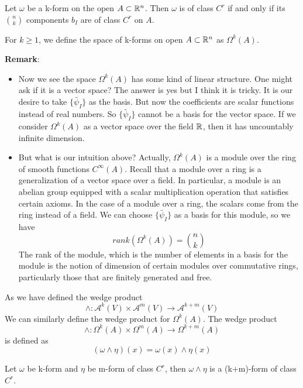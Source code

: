 \begin{corollary}
    Let $\omega$ be a k-form on the open $A\subset\mathbb{R}^n$. Then $\omega$ is of class $C^r$ if and only if its ${n \choose k}$ components $b_I$ are of class $C^r$ on $A$.
\end{corollary}

\begin{definition}
    For $k\geq 1$, we define the space of k-forms on open $A\subset\mathbb{R}^n$ as $\Omega^k(A)$.
\end{definition}

\noindent\textbf{Remark}:
\begin{itemize}
    \item Now we see the space $\Omega^k(A)$ has some kind of linear structure. One might ask if it is a vector space? The answer is yes but I think it is tricky.
    It is our desire to take $\{\tilde{\psi_I}\}$ as the basis. But now the coefficients are scalar functions instead of real numbers. So $\{\tilde{\psi_I}\}$ cannot be a basis for the vector space. If we consider $\Omega^k(A)$ as a vector space over the field $\mathbb{R}$, then it has  uncountably infinite dimension.
    \item But what is our intuition above? Actually, $\Omega^k(A)$ is a module over the ring of smooth functions $C^{\infty}(A)$. 
    Recall that a module over a ring is a generalization of a vector space over a field. In particular, a module is an abelian group equipped with a scalar multiplication operation that satisfies certain axioms. In the case of a module over a ring, the scalars come from the ring instead of a field. We can choose $\{\tilde{\psi_I}\}$ as a basis for this module, so we have 
    $$rank(\Omega^k(A))={n \choose k}$$
    The rank of the module, which is the number of elements in a basis for the module is the notion of dimension of certain modules over commutative rings, particularly those that are finitely generated and free. 
\end{itemize}

\begin{definition}
    As we have defined the wedge product $$\wedge:\mathcal{A}^k(V)\times \mathcal{A}^m(V)\longrightarrow\mathcal{A}^{k+m}(V)$$
    We can similarly define the wedge product for $\Omega^k(A)$. The wedge product $$\wedge:\Omega^k(A)\times\Omega^m(A)\longrightarrow\Omega^{k+m}(A)$$
    is defined as $$(\omega\wedge\eta)(x)=\omega(x) \wedge \eta(x)$$
\end{definition}

\begin{lemma}
    Let $\omega$ be k-form and $\eta$ be m-form of class $C^r$, then $\omega\wedge\eta$ is a (k+m)-form of class $C^r$.
\end{lemma}

